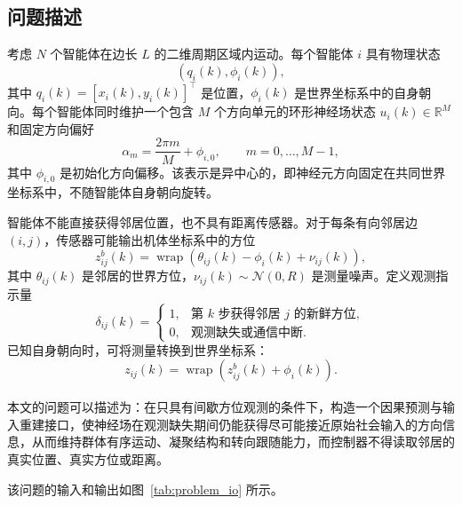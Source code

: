 \documentclass[UTF8,fontset=windows,11pt]{ctexart}
\newcommand{\upcite}[1]{\textsuperscript{\cite{#1}}}
\begin{document}
\subsection{问题描述}

考虑 $N$ 个智能体在边长 $L$ 的二维周期区域内运动。每个智能体 $i$ 具有物理状态
\begin{equation}
 (q_i(k),\phi_i(k)),
\end{equation}
其中 $q_i(k)=[x_i(k),y_i(k)]^\top$ 是位置，$\phi_i(k)$ 是世界坐标系中的自身朝向。每个智能体同时维护一个包含 $M$ 个方向单元的环形神经场状态 $u_i(k)\in\mathbb R^M$ 和固定方向偏好
\begin{equation}
 \alpha_m=\frac{2\pi m}{M}+\phi_{i,0},\qquad m=0,\ldots,M-1,
\end{equation}
其中 $\phi_{i,0}$ 是初始化方向偏移。该表示是异中心的，即神经元方向固定在共同世界坐标系中，不随智能体自身朝向旋转。

智能体不能直接获得邻居位置，也不具有距离传感器。对于每条有向邻居边 $(i,j)$，传感器可能输出机体坐标系中的方位
\begin{equation}
 z^b_{ij}(k)=
 \operatorname{wrap}\left(\theta_{ij}(k)-\phi_i(k)+\nu_{ij}(k)\right),
\end{equation}
其中 $\theta_{ij}(k)$ 是邻居的世界方位，$\nu_{ij}(k)\sim\mathcal N(0,R)$ 是测量噪声。定义观测指示量
\begin{equation}
 \delta_{ij}(k)=
 \begin{cases}
 1, & \text{第 $k$ 步获得邻居 $j$ 的新鲜方位},\\
 0, & \text{观测缺失或通信中断}.
 \end{cases}
\end{equation}
已知自身朝向时，可将测量转换到世界坐标系：
\begin{equation}
 z_{ij}(k)=\operatorname{wrap}(z^b_{ij}(k)+\phi_i(k)).
\end{equation}

本文的问题可以描述为：在只具有间歇方位观测的条件下\upcite{Xiourouppa2025}，构造一个因果预测与输入重建接口，使神经场在观测缺失期间仍能获得尽可能接近原始社会输入的方向信息，从而维持群体有序运动、凝聚结构和转向跟随能力，而控制器不得读取邻居的真实位置、真实方位或距离。

该问题的输入和输出如图~\ref{tab:problem_io} 所示。
\end{document}
